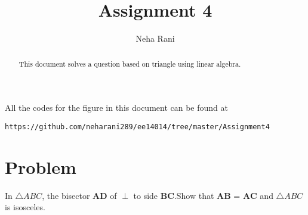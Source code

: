 \documentclass[journal,12pt,twocolumn]{IEEEtran}
\begin{document}
\makeatletter
{}
\makeatother
\let\StandardTheFigure\thefigure
\let\vec\mathbf
\renewcommand{\thefigure}{\theproblem}
\def\putbox#1#2#3{\makebox[0in][l]{\makebox[#1][l]{}\raisebox{\baselineskip}[0in][0in]{\raisebox{#2}[0in][0in]{#3}}}}
     \def\rightbox#1{\makebox[0in][r]{#1}}
     \def\centbox#1{\makebox[0in]{#1}}
     \def\topbox#1{\raisebox{-\baselineskip}[0in][0in]{#1}}
     \def\midbox#1{\raisebox{-0.5\baselineskip}[0in][0in]{#1}}
\vspace{3cm}
\title{Assignment 4}
\author{Neha Rani}
\maketitle
\newpage
\bigskip
\renewcommand{\thefigure}{\theenumi}
\renewcommand{\thetable}{\theenumi}
\begin{abstract}
This document solves a question based on triangle using linear algebra.
\end{abstract}
All the codes for the figure in this document can be found at
\begin{lstlisting}
https://github.com/neharani289/ee14014/tree/master/Assignment4
\end{lstlisting}
\section{Problem}
In $\triangle{ABC}$, the bisector $\vec{AD}$ of
$\perp$  to side $\vec{BC}$.Show that $\vec{AB}$ = $\vec{AC}$ and $\triangle{ABC}$ is isosceles.
\end{document}
